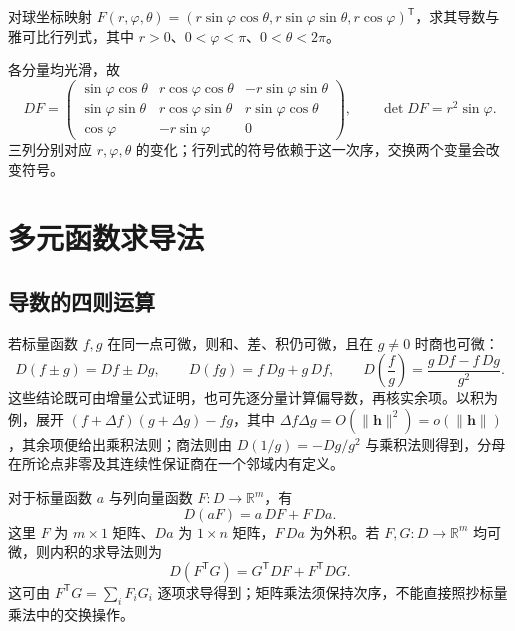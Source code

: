 \documentclass[UTF8,12pt,a4paper,fontset=fandol]{ctexbook}
\begin{document}
\begin{example}
\label{ex:spherical-jacobian-ch14}
对球坐标映射 $F(r,\varphi,\theta)=(r\sin\varphi\cos\theta,r\sin\varphi\sin\theta,r\cos\varphi)^{\mathsf T}$，求其导数与雅可比行列式，其中 $r>0$、$0<\varphi<\pi$、$0<\theta<2\pi$。
\end{example}
\begin{solve}
各分量均光滑，故
\[
    DF=
    \begin{pmatrix}
    \sin\varphi\cos\theta&r\cos\varphi\cos\theta&-r\sin\varphi\sin\theta\\
    \sin\varphi\sin\theta&r\cos\varphi\sin\theta&r\sin\varphi\cos\theta\\
    \cos\varphi&-r\sin\varphi&0
    \end{pmatrix},\qquad
    \det DF=r^2\sin\varphi.
\]
三列分别对应 $r,\varphi,\theta$ 的变化；行列式的符号依赖于这一次序，交换两个变量会改变符号。
\end{solve}

\section{多元函数求导法}
\label{sec:multivariable-differentiation-rules}


\subsection{导数的四则运算}
\label{subsec:arithmetic-rules-for-multivariable-derivatives}

若标量函数 $f,g$ 在同一点可微，则和、差、积仍可微，且在 $g\ne0$ 时商也可微：
\[
    D(f\pm g)=Df\pm Dg,\qquad
    D(fg)=f\,Dg+g\,Df,\qquad
    D\!\left(\frac fg\right)=\frac{g\,Df-f\,Dg}{g^2}.
\]
这些结论既可由增量公式证明，也可先逐分量计算偏导数，再核实余项。以积为例，展开 $(f+\Delta f)(g+\Delta g)-fg$，其中 $\Delta f\Delta g=O(\|\boldsymbol h\|^2)=o(\|\boldsymbol h\|)$，其余项便给出乘积法则；商法则由 $D(1/g)=-Dg/g^2$ 与乘积法则得到，分母在所论点非零及其连续性保证商在一个邻域内有定义。

对于标量函数 $a$ 与列向量函数 $F:D\to\mathbb R^m$，有
\[
    D(aF)=a\,DF+F\,Da.
\]
这里 $F$ 为 $m\times1$ 矩阵、$Da$ 为 $1\times n$ 矩阵，$F\,Da$ 为外积。若 $F,G:D\to\mathbb R^m$ 均可微，则内积的求导法则为
\[
    D(F^{\mathsf T}G)=G^{\mathsf T}DF+F^{\mathsf T}DG.
\]
这可由 $F^{\mathsf T}G=\sum_iF_iG_i$ 逐项求导得到；矩阵乘法须保持次序，不能直接照抄标量乘法中的交换操作。
\end{document}
